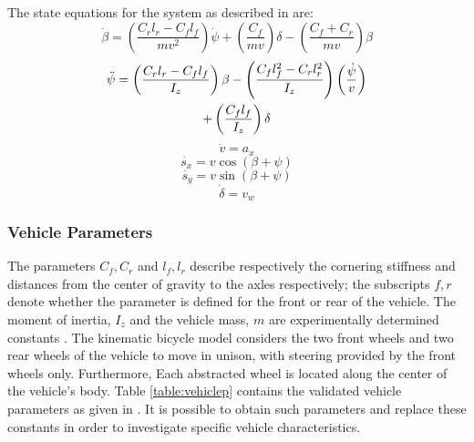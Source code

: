  The state equations for the system as described in \cite{Althoff2014} are:
\begin{equation}
	\label{eqn:beta}
	\dot{\beta}=\left(\frac{C_rl_r-C_fl_f}{mv^2} \right)\dot{\psi}+\left(\frac{C_f}{mv} \right)\delta-\left(\frac{C_f+C_r}{mv} \right)\beta
\end{equation}
\begin{gather}
	\label{eqn:psi}
	\ddot{\psi}=\left(\frac{C_rl_r-C_fl_f}{I_z} \right)\beta-\left(\frac{C_fl_f^2-C_rl_r^2}{I_z} \right)\left(\frac{\dot{\psi}}{v} \right) \notag \\
	+\left(\frac{C_fl_f}{I_z} \right)\delta
\end{gather}
\begin{equation}
	\label{eqn:v}
	\dot{v}=a_x
\end{equation}
\begin{equation}
	\label{eqn:sx}
	\dot{s_x}=v\cos{(\beta+\psi)}
\end{equation}
\begin{equation}
	\label{eqn:sy}
	\dot{s_y}=v\sin{(\beta+\psi)}	
\end{equation}	
\begin{equation}
	\label{eqn:delta}
	\dot{\delta}=v_w
\end{equation}


\subsubsection{Vehicle Parameters}
The parameters \(C_f,C_r\) and \(l_f, l_r\) describe respectively the cornering stiffness and distances from the center of gravity to the axles respectively; the subscripts $f,r$ denote whether the parameter is defined for the front or rear of the vehicle. The moment of inertia, \(I_z\) and the vehicle mass, \(m\) are experimentally determined constants \cite{Snider2009}. 
 The kinematic bicycle model considers the two front wheels and two rear wheels of the vehicle to move in unison, with steering provided by the front wheels only. Furthermore, Each abstracted wheel is located along the center of the vehicle's body. Table \ref{table:vehiclep} contains the validated vehicle parameters as given in \cite{Althoff2014}. It is possible to obtain such parameters and replace these constants in order to investigate specific vehicle characteristics. 

